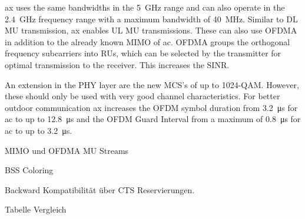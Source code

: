 \ac{ax} uses the same bandwidths in the \SI{5}{\giga\hertz} range and can also operate in the \SI{2.4}{\giga\hertz} frequency range with a maximum bandwidth of \SI{40}{\mega\hertz}. Similar to DL MU transmission, \ac{ax} enables UL MU transmissions. These can also use \ac{OFDMA} in addition to the already known \ac{MIMO} of \ac{ac}. \ac{OFDMA} groups the orthogonal frequency subcarriers into \ac{RU}s, which can be selected by the transmitter for optimal transmission to the receiver. This increases the \ac{SINR}.

An extension in the PHY layer are the new \ac{MCS}'s of up to 1024-\ac{QAM}. However, these should only be used with very good channel characteristics.
 For better outdoor communication \ac{ax} increases the \ac{OFDM} symbol duration from \SI{3.2}{\micro\second} for \ac{ac} to up to \SI{12.8}{\micro\second} and the \ac{OFDM} Guard Interval from a maximum of \SI{0.8}{\micro\second} for \ac{ac} to up to \SI{3.2}{\micro\second}.   
 
MIMO und OFDMA MU Streams

BSS Coloring

Backward Kompatibilität über CTS Reservierungen.

Tabelle Vergleich